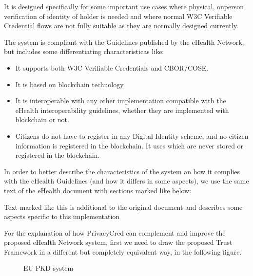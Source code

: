 \documentclass[a4paper,12pt,english]{sphinxhowto}
\begin{document}
\sphinxAtStartPar
It is designed specifically for some important use cases where physical, on\sphinxhyphen{}person verification of identity of holder is needed and where normal W3C Verifiable Credential flows are not fully suitable as they are normally designed currently.

\sphinxAtStartPar
The system is compliant with the Guidelines published by the eHealth Network, but includes some differentiating characteristicas like:
\begin{itemize}
\item {} 
\sphinxAtStartPar
It supports both W3C Verifiable Credentials and CBOR/COSE.

\item {} 
\sphinxAtStartPar
It is based on blockchain technology.

\item {} 
\sphinxAtStartPar
It is interoperable with any other implementation compatible with the eHealth interoperability guidelines, whether they are implemented with blockchain or not.

\item {} 
\sphinxAtStartPar
Citizens do not have to register in any Digital Identity scheme, and no citizen information is registered in the blockchain. It uses  which are never stored or registered in the blockchain.

\end{itemize}

\sphinxAtStartPar
In order to better describe the characteristics of the system an how it complies with the eHealth Guidelines (and how it differs in some aspects), we use  the same text of the eHealth document with sections marked like below:

\begin{sphinxShadowBox}

\sphinxAtStartPar
Text marked like this is additional to the original document and describes some aspects specific to this implementation
\end{sphinxShadowBox}

\sphinxAtStartPar
For the explanation of how PrivacyCred can complement and improve the proposed eHealth Network system, first we need to draw the proposed Trust Framework in a different but completely equivalent way, in the following figure.

\begin{figure}[htbp]
\centering
\capstart

\noindent{}
\caption{EU PKD system}\label{\detokenize{ssi/introduction:id1}}\end{figure}
\end{document}
